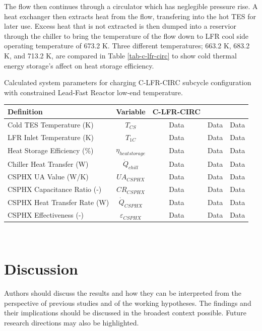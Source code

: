 \begin{paracol}{2}
\linenumbers
\switchcolumn

The flow then continues through a circulator which has neglegible pressure rise. A heat exchanger then extracts heat from the flow, transfering into the hot TES for later use. Excess heat that is not extracted is then dumped into a reservior through the chiller to bring the temperature of the flow down to LFR cool side operating temperature of 673.2 K. Three different temperatures; 663.2 K, 683.2 K, and 713.2 K, are compared in Table \ref{tab-c-lfr-circ} to show cold thermal energy storage's affect on heat storage efficiency.\\

\begin{specialtable}[H]
    \caption{Calculated system parameters for charging C-LFR-CIRC subcycle configuration with constrained Lead-Fast Reactor low-end temperature.\label{tab-c-lfr-circ}}
    \begin{tabular}{lcccc}
    \toprule
    \textbf{Definition} & \textbf{Variable} & \textbf{C-LFR-CIRC} &\\
    \midrule	
    Cold TES Temperature (K)	&	$T_{CS}$	&	Data	&	Data	&	Data	\\
    LFR Inlet Temperature (K)	&	$T_{1C}$	&	Data	&	Data	&	Data	\\
    Heat Storage Efficiency (\%)	&	$\eta_{heatstorage}$	&	Data	&	Data	&	Data	\\
    Chiller Heat Transfer (W)	&	$\dot{Q}_{chill}$	&	Data	&	Data	&	Data	\\
    CSPHX UA Value (W/K)	&	$UA_{CSPHX}$	&	Data	&	Data	&	Data	\\
    CSPHX Capacitance Ratio (-)	&	$CR_{CSPHX}$	&	Data	&	Data	&	Data	\\
    CSPHX Heat Transfer Rate (W)	&	$\dot{Q}_{CSPHX}$	&	Data	&	Data	&	Data	\\
    CSPHX Effectiveness (-)	&	$\varepsilon_{CSPHX}$	&	Data	&	Data	&	Data	\\
    \bottomrule
    \end{tabular}\\
\end{specialtable}



\section{Discussion}

Authors should discuss the results and how they can be interpreted from the perspective of previous studies and of the working hypotheses. The findings and their implications should be discussed in the broadest context possible. Future research directions may also be highlighted.


\end{paracol}
